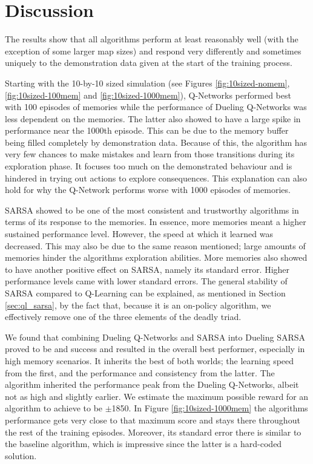 
\section{Discussion}\label{sec:discussion}
The results show that all algorithms perform at least reasonably well (with the exception of some larger map sizes) and respond very differently and sometimes uniquely to the demonstration data given at the start of the training process. 

Starting with the 10-by-10 sized simulation (see Figures \ref{fig:10sized-nomem}, \ref{fig:10sized-100mem} and \ref{fig:10sized-1000mem}), Q-Networks performed best with 100 episodes of memories while the performance of Dueling Q-Networks was less dependent on the memories. The latter also showed to have a large spike in performance near the 1000th episode. This can be due to the memory buffer being filled completely by demonstration data. Because of this, the algorithm has very few chances to make mistakes and learn from those transitions during its exploration phase. It focuses too much on the demonstrated behaviour and is hindered in trying out actions to explore consequences. This explanation can also hold for why the Q-Network performs worse with 1000 episodes of memories.

SARSA showed to be one of the most consistent and trustworthy algorithms in terms of its response to the memories. In essence, more memories meant a higher sustained performance level. However, the speed at which it learned was decreased. This may also be due to the same reason mentioned; large amounts of memories hinder the algorithms exploration abilities. More memories also showed to have another positive effect on SARSA, namely its standard error. Higher performance levels came with lower standard errors. The general stability of SARSA compared to Q-Learning can be explained, as mentioned in Section \ref{sec:ql_sarsa}, by the fact that, because it is an on-policy algorithm, we effectively remove one of the three elements of the deadly triad. 

We found that combining Dueling Q-Networks and SARSA into Dueling SARSA proved to be and success and resulted in the overall best performer, especially in high memory scenarios. It inherits the best of both worlds; the learning speed from the first, and the performance and consistency from the latter. The algorithm inherited the performance peak from the Dueling Q-Networks, albeit not as high and slightly earlier. We estimate the maximum possible reward for an algorithm to achieve to be $\pm$1850. In Figure \ref{fig:10sized-1000mem} the algorithms performance gets very close to that maximum score and stays there throughout the rest of the training episodes. Moreover, its standard error there is similar to the baseline algorithm, which is impressive since the latter is a hard-coded solution.


